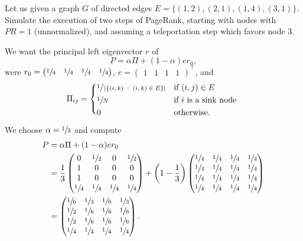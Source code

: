 \exercise

Let us given a graph $G$ of directed edges $E=\{(1,2), (2,1), (1,4), (3,1)\}$.
Simulate the execution of two steps of PageRank, starting with nodes with $PR=1$
(unnormalized), and assuming a teleportation step which favors node 3.

\solution

We want the principal left eigenvector $r$ of
%
$$P = \alpha\Pi + (1-\alpha) er_0,$$
%
were $r_0 = \begin{pmatrix}\sfrac{1}{4}&\sfrac{1}{4}&\sfrac{1}{4}&\sfrac{1}{4}
\end{pmatrix}$, $e=\begin{pmatrix}1&1&1&1\end{pmatrix}^\top$, and
%
\begin{equation*}
  \Pi_{ij} =
  \begin{cases*}
    \sfrac{1}{\left|\left\{(i,k)\;:\;(i,k)\in E\right\}\right|}
      & if $(i,j) \in E$ \\
    \sfrac{1}{N} & if $i$ is a sink node \\
    0 & otherwise.
  \end{cases*}
\end{equation*}

We choose $\alpha=\sfrac{1}{3}$ and compute
%
\begin{align*}
  P &=  \alpha\Pi + (1-\alpha) er_0 \\
    &=
        \frac{1}{3}
        \begin{pmatrix}
          0&\sfrac{1}{2}&0&\sfrac{1}{2} \\
          1&0&0&0 \\
          1&0&0&0 \\
          \sfrac{1}{4}&\sfrac{1}{4}&\sfrac{1}{4}&\sfrac{1}{4}
        \end{pmatrix}
        +
        \left(1-\frac{1}{3}\right)
        \begin{pmatrix}
          \sfrac{1}{4}&\sfrac{1}{4}&\sfrac{1}{4}&\sfrac{1}{4} \\
          \sfrac{1}{4}&\sfrac{1}{4}&\sfrac{1}{4}&\sfrac{1}{4} \\
          \sfrac{1}{4}&\sfrac{1}{4}&\sfrac{1}{4}&\sfrac{1}{4} \\
          \sfrac{1}{4}&\sfrac{1}{4}&\sfrac{1}{4}&\sfrac{1}{4}
        \end{pmatrix} \\
    &=
        \begin{pmatrix}
          \sfrac{1}{6}&\sfrac{1}{3}&\sfrac{1}{6}&\sfrac{1}{3} \\
          \sfrac{1}{2}&\sfrac{1}{6}&\sfrac{1}{6}&\sfrac{1}{6} \\
          \sfrac{1}{2}&\sfrac{1}{6}&\sfrac{1}{6}&\sfrac{1}{6} \\
          \sfrac{1}{4}&\sfrac{1}{4}&\sfrac{1}{4}&\sfrac{1}{4}
        \end{pmatrix}.
\end{align*}

